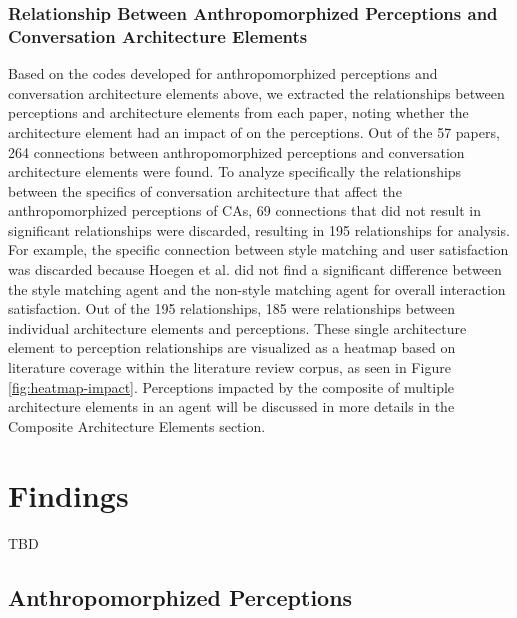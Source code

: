 \documentclass[sigconf,screen,review, anonymous]{acmart}
\newcommand{\cmt}[1]{}%
\begin{document}
\subsubsection*{Relationship Between Anthropomorphized Perceptions and Conversation Architecture Elements}
Based on the codes developed for anthropomorphized perceptions and conversation architecture elements above, we extracted the relationships between perceptions and architecture elements from each paper, noting whether the architecture element had an impact of on the perceptions. Out of the 57 papers, 264 connections between anthropomorphized perceptions and conversation architecture elements were found. To analyze specifically the relationships between the specifics of conversation architecture that affect the anthropomorphized perceptions of CAs, 69 connections that did not result in significant relationships were discarded, resulting in 195 relationships for analysis. For example, the specific connection between style matching and user satisfaction was discarded because Hoegen et al. \cite{hoegen2019end}\cmt{[31]} did not find a significant difference between the style matching agent and the non-style matching agent for overall interaction satisfaction. Out of the 195 relationships, 185 were relationships between individual architecture elements and perceptions. These single architecture element to perception relationships are visualized as a heatmap based on literature coverage within the literature review corpus, as seen in Figure \ref{fig:heatmap-impact}. Perceptions impacted by the composite of multiple architecture elements in an agent will be discussed in more details in the Composite Architecture Elements section.

\section{Findings}

TBD

\subsection{Anthropomorphized Perceptions}
\end{document}
